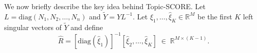 \documentclass[preprint,11pt]{article}
\numberwithin{equation}{section}
\newcommand{\diag}{\mathrm{diag}}
\begin{document}
We now briefly describe the key idea behind Topic-SCORE.  Let $L=\diag(N_1, N_2, \ldots, N_n)$ and $\widetilde{Y}= YL^{-1}$. 
Let $\hat{\xi}_1, \ldots, \hat{\xi}_K\in\mathbb{R}^M$ be the first $K$ left singular vectors of $\widetilde{Y}$ and define 
\[
\widehat{R}=[\diag(\hat{\xi}_1)]^{-1}[\hat{\xi}_2, \ldots, \hat{\xi}_K] \; \in\; \mathbb{R}^{M\times (K-1)}.
\]
\end{document}
